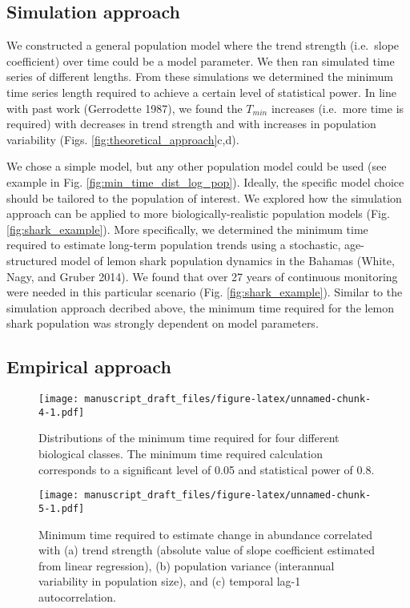 \documentclass[12pt,]{article}
\begin{document}
\subsection{Simulation approach}\label{simulation-approach-1}

We constructed a general population model where the trend strength
(i.e.~slope coefficient) over time could be a model parameter. We then
ran simulated time series of different lengths. From these simulations
we determined the minimum time series length required to achieve a
certain level of statistical power. In line with past work (Gerrodette
1987), we found the \(T_{min}\) increases (i.e.~more time is required)
with decreases in trend strength and with increases in population
variability (Figs. \ref{fig:theoretical_approach}c,d).

We chose a simple model, but any other population model could be used
(see example in Fig. \ref{fig:min_time_dist_log_pop}). Ideally, the
specific model choice should be tailored to the population of interest.
We explored how the simulation approach can be applied to more
biologically-realistic population models (Fig. \ref{fig:shark_example}).
More specifically, we determined the minimum time required to estimate
long-term population trends using a stochastic, age-structured model of
lemon shark population dynamics in the Bahamas (White, Nagy, and Gruber
2014). We found that over 27 years of continuous monitoring were needed
in this particular scenario (Fig. \ref{fig:shark_example}). Similar to
the simulation approach decribed above, the minimum time required for
the lemon shark population was strongly dependent on model parameters.

\subsection{Empirical approach}\label{empirical-approach-1}

\begin{figure}[htbp]
\centering
\texttt{[image: manuscript\_draft\_files/figure-latex/unnamed-chunk-4-1.pdf]}
\caption{Distributions of the minimum time required for four different
biological classes. The minimum time required calculation corresponds to
a significant level of 0.05 and statistical power of
0.8.\label{fig:min_time_dist}}
\end{figure}

\begin{figure}[htbp]
\centering
\texttt{[image: manuscript\_draft\_files/figure-latex/unnamed-chunk-5-1.pdf]}
\caption{Minimum time required to estimate change in abundance
correlated with (a) trend strength (absolute value of slope coefficient
estimated from linear regression), (b) population variance (interannual
variability in population size), and (c) temporal lag-1
autocorrelation.\label{fig:correlates}}
\end{figure}
\end{document}
